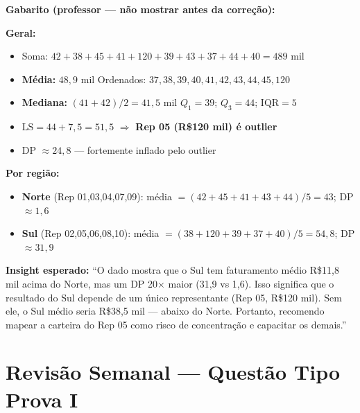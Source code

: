 \begin{SolvedBox}
\textbf{Gabarito (professor — não mostrar antes da correção):}

\textbf{Geral:}
\begin{itemize}
  \item Soma: $42+38+45+41+120+39+43+37+44+40 = 489$ mil
  \item \textbf{Média:} $48{,}9$ mil \quad Ordenados: $37,38,39,40,41,42,43,44,45,120$
  \item \textbf{Mediana:} $(41+42)/2 = 41{,}5$ mil \quad $Q_1 = 39$; $Q_3 = 44$; $\text{IQR} = 5$
  \item $\text{LS} = 44 + 7{,}5 = 51{,}5$ $\Rightarrow$ \textbf{Rep 05 (R\$120 mil) é outlier}
  \item DP $\approx 24{,}8$ — fortemente inflado pelo outlier
\end{itemize}

\textbf{Por região:}
\begin{itemize}
  \item \textbf{Norte} (Rep 01,03,04,07,09): média $= (42+45+41+43+44)/5 = 43$; DP $\approx 1{,}6$
  \item \textbf{Sul} (Rep 02,05,06,08,10): média $= (38+120+39+37+40)/5 = 54{,}8$; DP $\approx 31{,}9$
\end{itemize}

\textbf{Insight esperado:} ``O dado mostra que o Sul tem faturamento médio
R\$11,8 mil acima do Norte, mas um DP 20× maior (31,9 vs 1,6). Isso significa
que o resultado do Sul depende de um único representante (Rep 05, R\$120 mil).
Sem ele, o Sul médio seria R\$38,5 mil — abaixo do Norte. Portanto, recomendo
mapear a carteira do Rep 05 como risco de concentração e capacitar os demais.''
\end{SolvedBox}

\section{Revisão Semanal — Questão Tipo Prova I}

